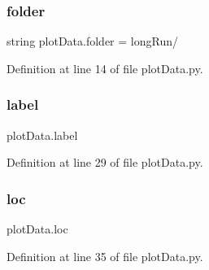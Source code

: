 \subsubsection{\texorpdfstring{folder}{folder}}
{\footnotesize\ttfamily string plot\+Data.\+folder = \textquotesingle{}long\+Run/\textquotesingle{}}



Definition at line 14 of file plot\+Data.\+py.

\mbox{\label{namespaceplot_data_a13e86a1d4baebb88c13b21cf4a6e474f}} 
\subsubsection{\texorpdfstring{label}{label}}
{\footnotesize\ttfamily plot\+Data.\+label}



Definition at line 29 of file plot\+Data.\+py.

\mbox{\label{namespaceplot_data_a3bb3a1ce0591a27573ad339091687219}} 
\subsubsection{\texorpdfstring{loc}{loc}}
{\footnotesize\ttfamily plot\+Data.\+loc}



Definition at line 35 of file plot\+Data.\+py.


